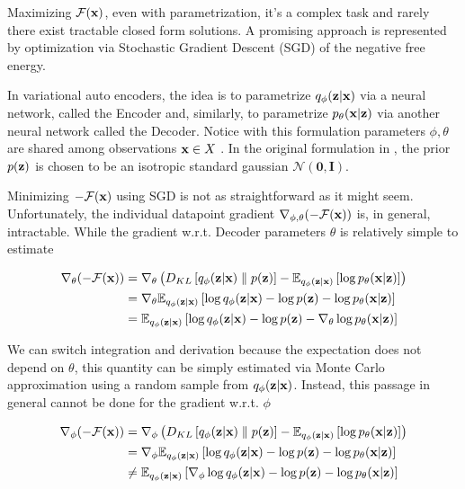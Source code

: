 \documentclass[12pt]{article}
\begin{document}
Maximizing \(\mathcal{F}(\textbf{x})\), even with parametrization, it's a complex task and rarely there exist tractable closed form solutions. A promising approach is represented by optimization via Stochastic Gradient Descent (SGD) of the negative free energy.


In variational auto encoders, the idea is to parametrize \(q_{\phi}( \textbf{z}| \textbf{x})\) via a neural network, called the Encoder and, similarly, to parametrize \(p_{\theta}( \textbf{x}| \textbf{z})\) via another neural network called the Decoder. Notice with this formulation parameters \(\phi, \theta\) are shared among observations \(\textbf{x} \in  X\) \cite{VAEIntro}. In the original formulation in \cite{kingma2022autoencoding}, the prior \(p( \textbf{z})\) is chosen to be an isotropic standard gaussian \(\mathcal{N}(\textbf{0}, \textbf{I})\). 


Minimizing \(-\mathcal{F}( \textbf{x})\) using SGD is not as straightforward as it might seem. Unfortunately, the individual datapoint gradient \(\nabla_{\phi, \theta}(-\mathcal{F}(\textbf{x}))\) is, in general, intractable\cite{VAEIntro}. While the gradient w.r.t. Decoder parameters \(\theta\) is relatively simple to estimate

\begin{align}
    \nabla_{\theta}(-\mathcal{F}(\textbf{x})) &= \nabla_{\theta} \left( D_{KL}\left[ q_{\phi}(\textbf{z}|\textbf{x}) \parallel p(\textbf{z}) \right] - \mathbb{E}_{q_{\phi}(\textbf{z}|\textbf{x})} \left[ \log p_{\theta}(\textbf{x}|\textbf{z}) \right] \right) \nonumber \\
    &= \nabla_{\theta} \mathbb{E}_{q_{\phi}(\textbf{z}|\textbf{x})} \left[\log q_\phi (\textbf{z}|\textbf{x}) -\log p(\textbf{z}) - \log p_\theta (\textbf{x} | \textbf{z})\right] \nonumber \\
    &= \mathbb{E}_{q_{\phi}(\textbf{z}|\textbf{x})} \left[\log q_\phi (\textbf{z}|\textbf{x}) -\log p(\textbf{z}) - \nabla_{\theta}\log p_\theta (\textbf{x} | \textbf{z}) \right] 
\end{align}

We can switch integration and derivation because the expectation does not depend on \(\theta\), this quantity can be simply estimated via Monte Carlo approximation using a random sample from \(q_\phi (\textbf{z}|\textbf{x})\). Instead, this passage in general cannot be done for the gradient w.r.t. \(\phi\)

\begin{align}
    \label{eqn:grad_phi_ELBO}
    \nabla_{\phi}(-\mathcal{F}(\textbf{x})) &= \nabla_{\phi} \left( D_{KL}\left[ q_{\phi}(\textbf{z}|\textbf{x}) \parallel p(\textbf{z}) \right] - \mathbb{E}_{q_{\phi}(\textbf{z}|\textbf{x})} \left[ \log p_{\theta}(\textbf{x}|\textbf{z}) \right] \right) \nonumber \\
    &= \nabla_{\phi} \mathbb{E}_{q_{\phi}(\textbf{z}|\textbf{x})} \left[\log q_\phi (\textbf{z}|\textbf{x}) -\log p(\textbf{z}) - \log p_\theta (\textbf{x} | \textbf{z})\right] \nonumber \\
    &\neq \mathbb{E}_{q_{\phi}(\textbf{z}|\textbf{x})} \left[\nabla_{\phi} \log q_\phi (\textbf{z}|\textbf{x}) -\log p(\textbf{z}) - \log p_\theta (\textbf{x} | \textbf{z}) \right] 
\end{align}
\end{document}
